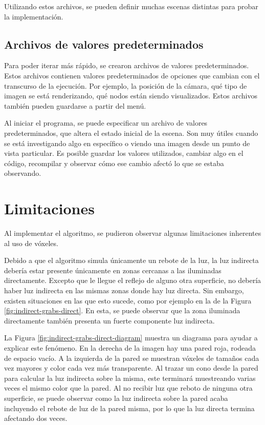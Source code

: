 Utilizando estos archivos, se pueden definir muchas escenas distintas para probar la implementación.

\subsection{Archivos de valores predeterminados}

Para poder iterar más rápido, se crearon archivos de valores predeterminados.
Estos archivos contienen valores predeterminados de opciones que cambian con el transcurso de la ejecución.
Por ejemplo, la posición de la cámara, qué tipo de imagen se está renderizando, qué nodos están siendo visualizados.
Estos archivos también pueden guardarse a partir del menú.

Al iniciar el programa, se puede especificar un archivo de valores predeterminados, que altera el estado inicial de la escena.
Son muy útiles cuando se está investigando algo en específico o viendo una imagen desde un punto de vista particular.
Es posible guardar los valores utilizados, cambiar algo en el código, recompilar y observar cómo ese cambio afectó lo que se estaba observando.

\section{Limitaciones}

Al implementar el algoritmo, se pudieron observar algunas limitaciones inherentes al uso de vóxeles.

Debido a que el algoritmo simula únicamente un rebote de la luz, la luz indirecta debería estar presente únicamente en zonas cercanas a las iluminadas directamente.
Excepto que le llegue el reflejo de alguno otra superficie, no debería haber luz indirecta en las mismas zonas donde hay luz directa.
Sin embargo, existen situaciones en las que esto sucede, como por ejemplo en la de la Figura \ref{fig:indirect-grabs-direct}.
En esta, se puede observar que la zona iluminada directamente también presenta un fuerte componente luz indirecta.

La Figura \ref{fig:indirect-grabs-direct-diagram} muestra un diagrama para ayudar a explicar este fenómeno.
En la derecha de la imagen hay una pared roja, rodeada de espacio vacío.
A la izquierda de la pared se muestran vóxeles de tamaños cada vez mayores y color cada vez más transparente.
Al trazar un cono desde la pared para calcular la luz indirecta sobre la misma, este terminará muestreando varias veces el mismo color que la pared.
Al no recibir luz que reboto de ninguna otra superficie, se puede observar como la luz indirecta sobre la pared acaba incluyendo el rebote de luz de la pared misma, por lo que la luz directa termina afectando dos veces.

